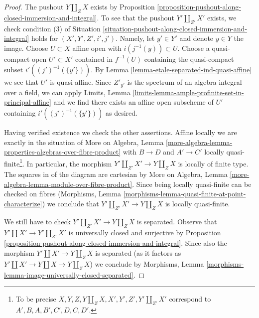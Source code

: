 \documentclass[10pt,a4paper]{amsart}
\theoremstyle{plain}
\theoremstyle{definition}
\theoremstyle{remark}
\numberwithin{equation}{subsection}
\begin{document}
\begin{proof}
The pushout $Y \amalg_Z X$ exists by
Proposition \ref{proposition-pushout-along-closed-immersion-and-integral}.
To see that the pushout $Y' \amalg_{Z'} X'$ exists, we check
condition (3) of
Situation \ref{situation-pushout-along-closed-immersion-and-integral}
holds for $(X', Y', Z', i', j')$.
Namely, let $y' \in Y'$ and denote $y \in Y$ the image.
Choose $U \subset X$ affine open with $i(j^{-1}(y)) \subset U$.
Choose a quasi-compact open $U' \subset X'$ contained in
$f^{-1}(U)$ containing the quasi-compact subset $i'((j')^{-1}(\{y'\}))$.
By Lemma \ref{lemma-etale-separated-ind-quasi-affine}
we see that $U'$ is quasi-affine. Since $Z'_{y'}$ is the spectrum
of an algebra integral over a field, we can apply
Limits, Lemma \ref{limits-lemma-ample-profinite-set-in-principal-affine}
and we find there exists an affine open subscheme of $U'$ containing
$i'((j')^{-1}(\{y'\}))$ as desired.

\medskip\noindent
Having verified existence we check the other assertions.
Affine locally we are exactly in the situation of More on Algebra, Lemma
\ref{more-algebra-lemma-properties-algebras-over-fibre-product}
with $B \to D$ and $A' \to C'$ locally quasi-finite\footnote{To be precise
$X, Y, Z, Y \amalg_Z X, X', Y', Z', Y' \amalg_{Z'} X'$
correspond to $A', B, A, B', C', D, C, D'$.}.
In particular, the morphism $Y' \amalg_{Z'} X' \to Y \amalg_Z X$ is locally
of finite type. The squares in of the diagram are cartesian by
More on Algebra, Lemma \ref{more-algebra-lemma-module-over-fibre-product}.
Since being locally quasi-finite can be checked on fibres
(Morphisms, Lemma \ref{morphisms-lemma-quasi-finite-at-point-characterize})
we conclude that $Y' \amalg_{Z'} X' \to Y \amalg_Z X$
is locally quasi-finite.

\medskip\noindent
We still have to check $Y' \amalg_{Z'} X' \to Y \amalg_Z X$ is separated.
Observe that $Y' \amalg X' \to Y' \amalg_{Z'} X'$ is universally closed
and surjective by 
Proposition \ref{proposition-pushout-along-closed-immersion-and-integral}.
Since also the morphism $Y' \amalg X' \to Y \amalg_Z X$ is separated
(as it factors as $Y' \amalg X' \to Y \amalg X \to Y \amalg_Z X$)
we conclude by
Morphisms, Lemma \ref{morphisms-lemma-image-universally-closed-separated}.
\end{proof}
\end{document}
